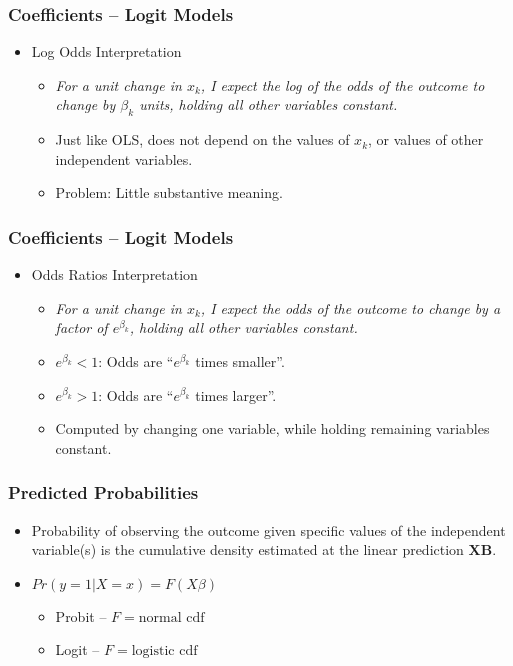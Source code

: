 \documentclass{beamer}
\begin{document}
\begin{frame}
	\frametitle{Coefficients -- Logit Models}
	\begin{itemize}
		\item Log Odds Interpretation
		\begin{itemize}
			\item \textit{For a unit change in $x_{k}$, I expect the log of the odds of the outcome to change by $\beta_{k}$ units, holding all other variables constant.}
			\item Just like OLS, does not depend on the values of $x_{k}$, or values of other independent variables.
			\item Problem: Little substantive meaning.
		\end{itemize}
	\end{itemize}
\end{frame}

\begin{frame}
	\frametitle{Coefficients -- Logit Models}
	\begin{itemize}
		\item Odds Ratios Interpretation
		\begin{itemize}
			\item \textit{For a unit change in $x_{k}$, I expect the odds of the outcome to change by a factor of $e^{\beta_{k}}$, holding all other variables constant.}
			\item $e^{\beta_{k}}<1$: Odds are ``$e^{\beta_{k}}$ times smaller''.
			\item $e^{\beta_{k}}>1$: Odds are ``$e^{\beta_{k}}$ times larger''.
			\item Computed by changing one variable, while holding remaining variables constant.
		\end{itemize}
	\end{itemize}
\end{frame}

\begin{frame}
	\frametitle{Predicted Probabilities}
	\begin{itemize}
		\item Probability of observing the outcome given specific values of the independent variable(s) is the cumulative density estimated at the linear prediction $\mathbf{XB}$.
		\item $Pr\left(y=1|X=x\right)=F(X\beta)$
		\begin{itemize}
			\item Probit -- $F=\mbox{normal cdf}$
			\item Logit -- $F=\mbox{logistic cdf}$
		\end{itemize}
	\end{itemize}
\end{frame}
\end{document}
